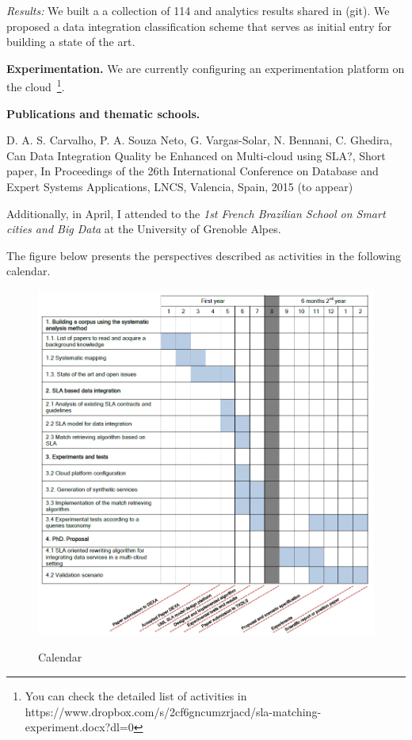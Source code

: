 \documentclass[11pt,a4paper,oneside]{report}
\begin{document}
\noindent
{\em Results:} We built a  a collection of 114 and analytics results shared in (git). We proposed a data integration classification scheme that serves as initial entry for building a state of the art. 


\noindent
\textbf{Experimentation.} We are currently  configuring an experimentation platform on the cloud~\footnote{You can check the detailed list of activities in https://www.dropbox.com/s/2cf6gncumzrjacd/sla-matching-experiment.docx?dl=0}.
%

\noindent
\textbf{Publications and thematic schools.}

\noindent
D. A. S. Carvalho, P. A. Souza Neto, G. Vargas-Solar, N. Bennani, C. Ghedira, Can Data Integration Quality be Enhanced on Multi-cloud using SLA?, Short paper, In Proceedings of the 26th International Conference on Database and Expert Systems Applications, LNCS, Valencia, Spain, 2015 (to appear)

\noindent
Additionally, in April, I attended to the \emph{1st French Brazilian School on Smart cities and Big Data} at the University of Grenoble Alpes.

\noindent
The figure below presents the perspectives described as activities in the following calendar. 

\begin{figure}[!b]
\center
\includegraphics[scale=0.50]{calendario.png} \label{fig:calendar} \caption{Calendar}
\end{figure}



\end{document}
